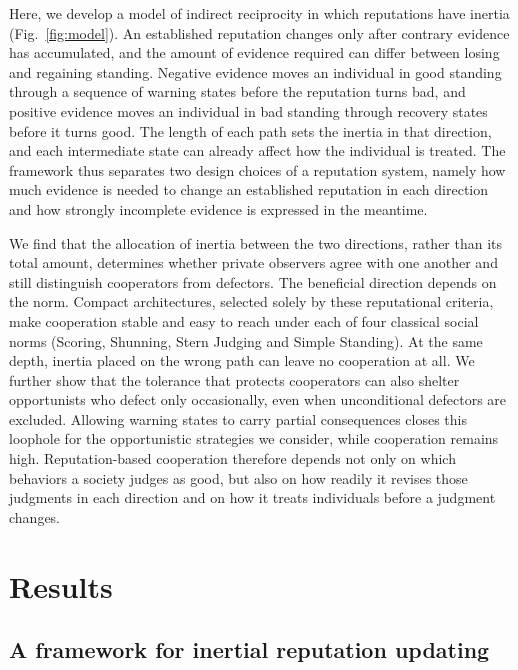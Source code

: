 \documentclass[fleqn,10pt]{wlscirep}
\theoremstyle{plain}
\begin{document}
Here, we develop a model of indirect reciprocity in which reputations have inertia (Fig.~\ref{fig:model}). An established reputation changes only after contrary evidence has accumulated, and the amount of evidence required can differ between losing and regaining standing. Negative evidence moves an individual in good standing through a sequence of warning states before the reputation turns bad, and positive evidence moves an individual in bad standing through recovery states before it turns good. The length of each path sets the inertia in that direction, and each intermediate state can already affect how the individual is treated. The framework thus separates two design choices of a reputation system, namely how much evidence is needed to change an established reputation in each direction and how strongly incomplete evidence is expressed in the meantime.

We find that the allocation of inertia between the two directions, rather than its total amount, determines whether private observers agree with one another and still distinguish cooperators from defectors. The beneficial direction depends on the norm. Compact architectures, selected solely by these reputational criteria, make cooperation stable and easy to reach under each of four classical social norms (Scoring, Shunning, Stern Judging and Simple Standing). At the same depth, inertia placed on the wrong path can leave no cooperation at all. We further show that the tolerance that protects cooperators can also shelter opportunists who defect only occasionally, even when unconditional defectors are excluded. Allowing warning states to carry partial consequences closes this loophole for the opportunistic strategies we consider, while cooperation remains high. Reputation-based cooperation therefore depends not only on which behaviors a society judges as good, but also on how readily it revises those judgments in each direction and on how it treats individuals before a judgment changes.

\section*{Results}

\subsection*{A framework for inertial reputation updating}
\end{document}
